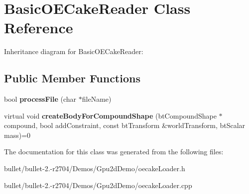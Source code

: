 \hypertarget{class_basic_o_e_cake_reader}{\section{Basic\+O\+E\+Cake\+Reader Class Reference}
\label{class_basic_o_e_cake_reader}
}


Inheritance diagram for Basic\+O\+E\+Cake\+Reader\+:
\subsection*{Public Member Functions}
\begin{DoxyCompactItemize}
\item 
\hypertarget{class_basic_o_e_cake_reader_a68ac78117ff798556194e14e1ebbf789}{bool {\bfseries process\+File} (char $\ast$file\+Name)}\label{class_basic_o_e_cake_reader_a68ac78117ff798556194e14e1ebbf789}

\item 
\hypertarget{class_basic_o_e_cake_reader_a11f7e87a215ac74996961a526365620c}{virtual void {\bfseries create\+Body\+For\+Compound\+Shape} (bt\+Compound\+Shape $\ast$compound, bool add\+Constraint, const bt\+Transform \&world\+Transform, bt\+Scalar mass)=0}\label{class_basic_o_e_cake_reader_a11f7e87a215ac74996961a526365620c}

\end{DoxyCompactItemize}


The documentation for this class was generated from the following files\+:\begin{DoxyCompactItemize}
\item 
bullet/bullet-\/2.-\/r2704/\+Demos/\+Gpu2d\+Demo/oecake\+Loader.\+h\item 
bullet/bullet-\/2.-\/r2704/\+Demos/\+Gpu2d\+Demo/oecake\+Loader.\+cpp\end{DoxyCompactItemize}
